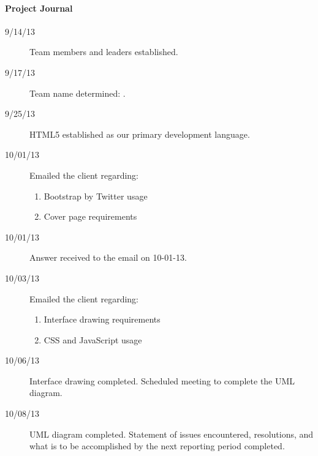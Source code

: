 

\singlespace

\paragraph{Project Journal}
\begin{description}
\item[9/14/13] Team members and leaders established.
\item[9/17/13] Team name determined: \emph\teamName.
\item[9/25/13] HTML5 established as our primary development language.
\item[10/01/13] Emailed the client regarding:
    \begin{enumerate}
        \item Bootstrap by Twitter usage
        \item Cover page requirements
    \end{enumerate}
\item[10/01/13] Answer received to the email on 10-01-13.
\item[10/03/13] Emailed the client regarding:
    \begin{enumerate}
        \item Interface drawing requirements
        \item CSS and JavaScript usage
    \end{enumerate}
\item[10/06/13] Interface drawing completed. Scheduled meeting to complete the UML diagram.
\item[10/08/13] UML diagram completed. Statement of issues encountered, resolutions, and 
                what is to be accomplished by the next reporting period completed.
\end{description}

